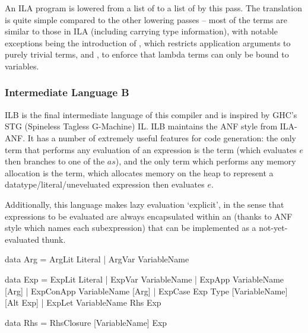 \documentclass[dissertation.tex]{subfiles}
\begin{document}
{{{            An ILA program is lowered from a list of  to a list of  by
            this pass. The translation is quite simple compared to the other lowering passes -- most of the terms are
            similar to those in ILA (including carrying type information), with notable exceptions being the
            introduction of , which restricts application arguments to purely trivial terms, and
            , to enforce that lambda terms can only be bound to variables.

        }
        \subsubsection{Intermediate Language B}
        {

            ILB is the final intermediate language of this compiler and is inspired by GHC's STG (Spineless Tagless
            G-Machine) IL. ILB maintains the ANF style from ILA-ANF. It has a number of extremely useful features for
            code generation: the only term that performs any evaluation of an expression is the  term (which evaluates \(e\) then branches to one of the \(as\)), and the only term which
            performs any memory allocation is the \haskell{ExpLit #\(v\ r\ e\)#} term, which allocates memory on the
            heap to represent a datatype/literal/uneveluated expression then evaluates \(e\).

            Additionally, this language makes lazy evaluation `explicit', in the sense that expressions to be evaluated
            are always encapsulated within an \haskell{RhsClosure} (thanks to ANF style which names each subexpression)
            that can be implemented as a not-yet-evaluated thunk.

            \begin{haskellfigure}
            data Arg = ArgLit Literal
                     | ArgVar VariableName

            data Exp = ExpLit Literal
                     | ExpVar VariableName
                     | ExpApp VariableName [Arg]
                     | ExpConApp VariableName [Arg]
                     | ExpCase Exp Type [VariableName] [Alt Exp]
                     | ExpLet VariableName Rhs Exp

            data Rhs = RhsClosure [VariableName] Exp
            \end{haskellfigure}

}}}
\end{document}
